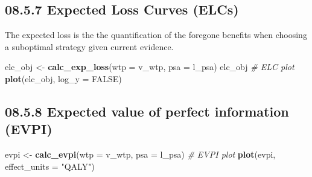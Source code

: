 \documentclass[
]{article}
\newenvironment{Shaded}{\begin{snugshade}}{\end{snugshade}}
\newcommand{\CommentTok}[1]{\textcolor[rgb]{0.56,0.35,0.01}{\textit{#1}}}
\newcommand{\DataTypeTok}[1]{\textcolor[rgb]{0.13,0.29,0.53}{#1}}
\newcommand{\KeywordTok}[1]{\textcolor[rgb]{0.13,0.29,0.53}{\textbf{#1}}}
\newcommand{\NormalTok}[1]{#1}
\newcommand{\OtherTok}[1]{\textcolor[rgb]{0.56,0.35,0.01}{#1}}
\newcommand{\StringTok}[1]{\textcolor[rgb]{0.31,0.60,0.02}{#1}}
\begin{document}
\hypertarget{expected-loss-curves-elcs}{%
\subsection{08.5.7 Expected Loss Curves
(ELCs)}\label{expected-loss-curves-elcs}}

The expected loss is the the quantification of the foregone benefits
when choosing a suboptimal strategy given current evidence.

\begin{Shaded}
\begin{Highlighting}[]
\NormalTok{elc_obj <-}\StringTok{ }\KeywordTok{calc_exp_loss}\NormalTok{(}\DataTypeTok{wtp =}\NormalTok{ v_wtp, }\DataTypeTok{psa =}\NormalTok{ l_psa)}
\NormalTok{elc_obj}
\CommentTok{# ELC plot}
\KeywordTok{plot}\NormalTok{(elc_obj, }\DataTypeTok{log_y =} \OtherTok{FALSE}\NormalTok{)}
\end{Highlighting}
\end{Shaded}

\hypertarget{expected-value-of-perfect-information-evpi}{%
\subsection{08.5.8 Expected value of perfect information
(EVPI)}\label{expected-value-of-perfect-information-evpi}}

\begin{Shaded}
\begin{Highlighting}[]
\NormalTok{evpi <-}\StringTok{ }\KeywordTok{calc_evpi}\NormalTok{(}\DataTypeTok{wtp =}\NormalTok{ v_wtp, }\DataTypeTok{psa =}\NormalTok{ l_psa)}
\CommentTok{# EVPI plot}
\KeywordTok{plot}\NormalTok{(evpi, }\DataTypeTok{effect_units =} \StringTok{"QALY"}\NormalTok{)}
\end{Highlighting}
\end{Shaded}
\end{document}
